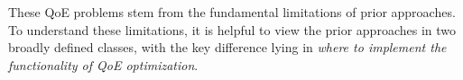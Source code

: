 
These QoE problems stem from the fundamental limitations of prior 
approaches. To understand these limitations, it is helpful to view the 
prior approaches in two broadly defined classes, 
with the key difference lying in
{\em where to implement the functionality of QoE optimization}.



